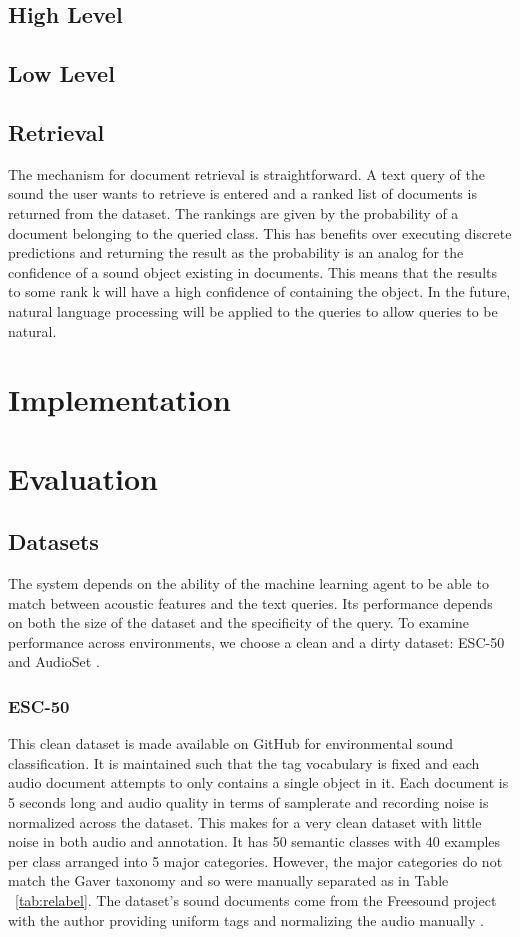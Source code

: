 \subsection{High Level}

\subsection{Low Level}

\subsection{Retrieval}
The mechanism for document retrieval is straightforward. A text query of the sound the user wants to retrieve is entered and a ranked list of documents is returned from the dataset. The rankings are given by the probability of a document belonging to the queried class. This has benefits over executing discrete predictions and returning the result as the probability is an analog for the confidence of a sound object existing in documents. This means that the results to some rank k will have a high confidence of containing the object. In the future, natural language processing will be applied to the queries to allow queries to be natural.

\section{Implementation}

\section{Evaluation}

\subsection{Datasets}
The system depends on the ability of the machine learning agent to be able to match between acoustic features and the text queries. Its performance depends on both the size of the dataset and the specificity of the query. To examine performance across environments, we choose a clean and a dirty dataset: ESC-50 \cite{Piczak2015} and AudioSet \cite{Gemmeke2017}.

\subsubsection{ESC-50}
This clean dataset is made available on GitHub for environmental sound classification. It is maintained such that the tag vocabulary is fixed and each audio document attempts to only contains a single object in it. Each document is 5 seconds long and audio quality in terms of samplerate and recording noise is normalized across the dataset. This makes for a very clean dataset with little noise in both audio and annotation. It has 50 semantic classes with 40 examples per class arranged into 5 major categories. However, the major categories do not match the Gaver taxonomy and so were manually separated as in Table ~\ref{tab:relabel}. The dataset's sound documents come from the Freesound project with the author providing uniform tags and normalizing the audio manually \cite{Font2013}.

